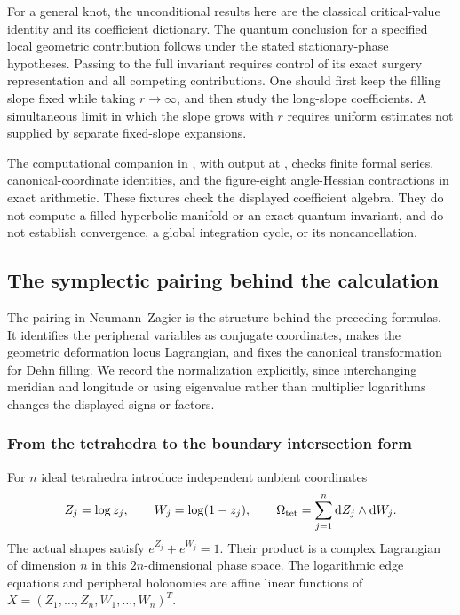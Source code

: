 For a general knot, the unconditional results here are the classical
critical-value identity and its coefficient dictionary. The quantum
conclusion for a specified local geometric contribution follows under
the stated stationary-phase hypotheses. Passing to the full invariant
requires control of its exact surgery representation and all competing
contributions. One should first keep the filling slope fixed while
taking $r\to\infty$, and then study the long-slope coefficients.
A simultaneous limit in which the slope grows with $r$ requires
uniform estimates not supplied by separate fixed-slope expansions.

The computational companion in
, with output at
, checks finite formal
series, canonical-coordinate identities, and the figure-eight
angle-Hessian contractions in exact arithmetic. These fixtures
check the displayed coefficient algebra. They do not compute a
filled hyperbolic manifold or an exact quantum invariant, and do
not establish convergence, a global integration cycle, or its
noncancellation.

\subsection{The symplectic pairing behind the calculation}
\label{sec:NZsymplectic}

The pairing in Neumann--Zagier is the structure behind the preceding
formulas. It identifies the peripheral variables as conjugate coordinates,
makes the geometric deformation locus Lagrangian, and fixes the canonical
transformation for Dehn filling. We record the normalization explicitly,
since interchanging meridian and longitude or using eigenvalue rather
than multiplier logarithms changes the displayed signs or factors.

\subsubsection{From the tetrahedra to the boundary intersection form}

For $n$ ideal tetrahedra introduce independent ambient coordinates
\[
 Z_j=\log z_j,\qquad W_j=\log(1-z_j),\qquad
 \Omega_{\rm tet}=\sum_{j=1}^n\mathop{}\!\mathrm d Z_j\wedge\mathop{}\!\mathrm d W_j.
\]
The actual shapes satisfy $e^{Z_j}+e^{W_j}=1$. Their product is a
complex Lagrangian of dimension $n$ in this $2n$-dimensional phase space.
The logarithmic edge equations and peripheral holonomies are affine
linear functions of $X=(Z_1,\ldots,Z_n,W_1,\ldots,W_n)^T$.

